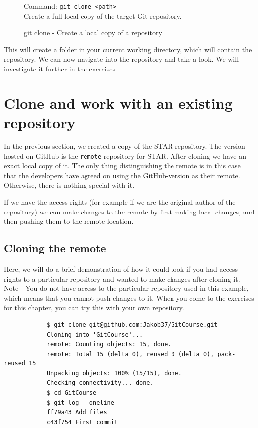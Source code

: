 \documentclass[../main/git_course_main.tex]{subfiles}
\begin{document}
	\begin{figure}[h!]
		\begin{bluebox}
			Command: \verb$git clone <path>$ \\
			
			Create a full local copy of the target Git-repository.
		\end{bluebox}
		\label{command:clone}
		\caption{git clone - Create a local copy of a repository}
	\end{figure}
	
	This will create a folder in your current working directory, which will contain the repository. We can now navigate into the repository and take a look. We will investigate it further in the exercises.
	
	\section{Clone and work with an existing repository}
	
	In the previous section, we created a copy of the STAR repository. The version hosted
	on GitHub is the \verb$remote$ repository for STAR. After cloning we have an exact local
	copy of it. The only thing distinguishing the remote is in this case that the developers
	have agreed on using the GitHub-version as their remote. Otherwise, there is nothing
	special with it.
	
	If we have the access rights (for example if we are the original author of the repository) we can make changes to the remote by first making local changes, and then pushing them to the remote location.
	
	\subsection{Cloning the remote}
	Here, we will do a brief demonstration of how it could look if you had access rights
	to a particular repository and wanted to make changes after cloning it. Note - 
	You do not have access to the particular repository used in this example, which means that you cannot push changes to it. When you come to the exercises for this chapter, you can try this with your own repository.
	
	\begin{codebox}
		\begin{lstlisting}
			$ git clone git@github.com:Jakob37/GitCourse.git
			Cloning into 'GitCourse'...
			remote: Counting objects: 15, done.
			remote: Total 15 (delta 0), reused 0 (delta 0), pack-reused 15
			Unpacking objects: 100% (15/15), done.
			Checking connectivity... done.
			$ cd GitCourse
			$ git log --oneline
			ff79a43 Add files
			c43f754 First commit
		\end{lstlisting}
	\end{codebox}
	
\end{document}
